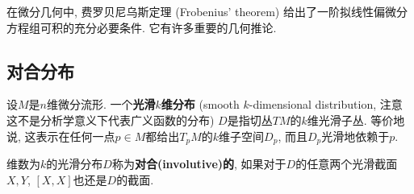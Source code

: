 
在微分几何中, 费罗贝尼乌斯定理 (Frobenius' theorem) 给出了一阶拟线性偏微分方程组可积的充分必要条件. 它有许多重要的几何推论.

\subsection{对合分布}
设$M$是$n$维微分流形. 一个\textbf{光滑$k$维分布} (smooth $k$-dimensional distribution, 注意这不是分析学意义下代表广义函数的分布) $D$是指切丛$TM$的$k$维光滑子丛. 等价地说, 这表示在任何一点$p\in M$都给出$T_pM$的$k$维子空间$D_p$, 而且$D_p$光滑地依赖于$p$. 

维数为$k$的光滑分布$D$称为\textbf{对合(involutive)的}, 如果对于$D$的任意两个光滑截面$X,Y$, $[X,X]$也还是$D$的截面. 